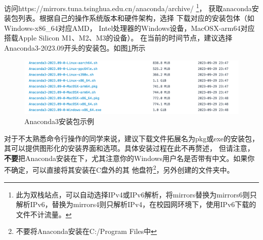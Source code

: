 访问https://mirrors.tuna.tsinghua.edu.cn/anaconda/archive/ \footnote{此为双栈站点，可以自动选择IPv4或IPv6解析，将mirrors替换为mirrors6则只解析IPv6，替换为mirrors4则只解析IPv4，在校园网环境下，使用IPv6下载的文件不计流量。}，
获取anaconda安装包列表。根据自己的操作系统版本和硬件架构，选择
下载对应的安装包体（如Windows-x86\_64对应AMD，
Intel处理器的Windows设备，MacOSX-arm64对应搭载Apple Silicon M1、M2、M3的设备）。
在当前的时间节点，建议选择Anaconda3-2023.09开头的安装包。如图\ref{fig:anacondaSelection}所示
\begin{figure}[htbp]
    \centering
    \includegraphics*[width=0.8\linewidth]{pic/tuna_anacondaDownload.png}
    \caption{Anaconda3安装包示例}
    \label{fig:anacondaSelection}
\end{figure}

对于不太熟悉命令行操作的同学来说，建议下载文件拓展名为pkg或exe的安装包，其可以提供图形化的安装界面和选项。具体安装过程在此不再赘述，
但请注意，\textbf{不要}把Anaconda安装在下，尤其注意你的Windows用户名是否带有中文。如果你不确定，可以直接将其安装在C盘外的其
他盘符\footnote{不要将Anaconda安装在C:/Program Files中}，另外创建的文件夹中。

